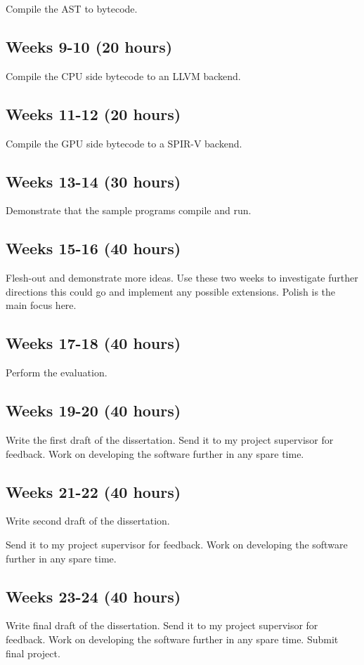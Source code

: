 \documentclass[11pt]{article}
\begin{document}
Compile the AST to bytecode.

\subsection{Weeks 9-10 (20 hours)}

Compile the CPU side bytecode to an LLVM backend.

\subsection{Weeks 11-12 (20 hours)}

Compile the GPU side bytecode to a SPIR-V backend.

\subsection{Weeks 13-14 (30 hours)}

Demonstrate that the sample programs compile and run.

\subsection{Weeks 15-16 (40 hours)}

Flesh-out and demonstrate more ideas. Use these two weeks to investigate
further directions this could go and implement any possible extensions. Polish
is the main focus here.

\subsection{Weeks 17-18 (40 hours)}

Perform the evaluation.

\subsection{Weeks 19-20 (40 hours)}

Write the first draft of the dissertation. Send it to my project supervisor for
feedback. Work on developing the software further in any spare time.

\subsection{Weeks 21-22 (40 hours)}

Write second draft of the dissertation.

Send it to my project supervisor for feedback. Work on developing the software
further in any spare time.

\subsection{Weeks 23-24 (40 hours)}

Write final draft of the dissertation. Send it to my project supervisor for
feedback. Work on developing the software further in any spare time. Submit
final project.


\end{document}
